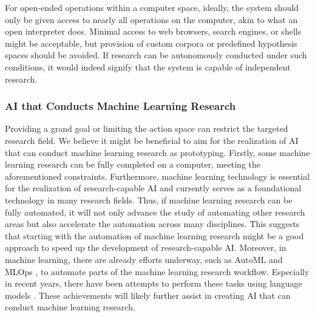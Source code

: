 For open-ended operations within a computer space, ideally, the system should only be given access to nearly all operations on the computer, akin to what an open interpreter \cite{openinterpreter} does. Minimal access to web browsers, search engines, or shells might be acceptable, but provision of custom corpora or predefined hypothesis spaces should be avoided. If research can be autonomously conducted under such conditions, it would indeed signify that the system is capable of independent research.



\subsubsection{AI that Conducts Machine Learning Research}
Providing a grand goal or limiting the action space can restrict the targeted research field. We believe it might be beneficial to aim for the realization of AI that can conduct machine learning research as prototyping. Firstly, some machine learning research can be fully completed on a computer, meeting the aforementioned constraints. Furthermore, machine learning technology is essential for the realization of research-capable AI and currently serves as a foundational technology in many research fields. Thus, if machine learning research can be fully automated, it will not only advance the study of automating other research areas but also accelerate the automation across many disciplines. This suggests that starting with the automation of machine learning research might be a good approach to speed up the development of research-capable AI. Moreover, in machine learning, there are already efforts underway, such as AutoML \cite{hutter2019automated,bischl2023hyperparameter,lindauer2020best,white2023neural} and MLOps \cite{kreuzberger2023machine}, to automate parts of the machine learning research workflow. Especially in recent years, there have been attempts to perform these tasks using language models \cite{vijay2023prompt,zheng2023can}. These achievements will likely further assist in creating AI that can conduct machine learning research.


